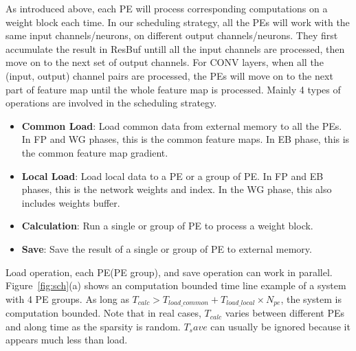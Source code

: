 As introduced above, each PE will process corresponding computations on a weight block each time. In our scheduling strategy, all the PEs will work with the same input channels/neurons, on different output channels/neurons. They first accumulate the result in ResBuf untill all the input channels are processed, then move on to the next set of output channels. For CONV layers, when all the (input, output) channel pairs are processed, the PEs will move on to the next part of feature map until the whole feature map is processed. Mainly 4 types of operations are involved in the scheduling strategy.

\begin{itemize}
	\item {{\bf{Common Load}}: Load common data from external memory to all the PEs. In FP and WG phases, this is the common feature maps. In EB phase, this is the common feature map gradient.}
    \item {{\bf{Local Load}}: Load local data to a PE or a group of PE. In FP and EB phases, this is the network weights and index. In the WG phase, this also includes weights buffer.}
    \item {{\bf{Calculation}}: Run a single or group of PE to process a weight block.}
    \item {{\bf{Save}}: Save the result of a single or group of PE to external memory.}
\end{itemize}

Load operation, each PE(PE group), and save operation can work in parallel. Figure~\ref{fig:sch}(a) shows an computation bounded time line example of a system with 4 PE groups. As long as $T_{calc}>T_{load\_common} + T_{load\_local}\times N_{pe}$, the system is computation bounded. Note that in real cases, $T_{calc}$ varies between different PEs and along time as the sparsity is random. $T_save$ can usually be ignored because it appears much less than load.   


